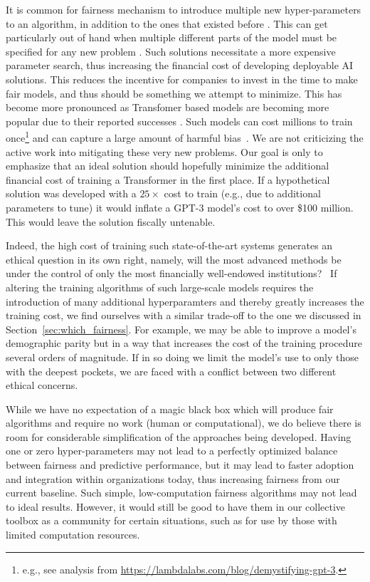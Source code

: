 \documentclass[11pt]{article}
\begin{document}
It is common for fairness mechanism to introduce multiple new hyper-parameters to an algorithm, in addition to the ones that existed before \cite{pmlr-v28-zemel13,Louizos2016,Edwards2016}. This can get particularly out of hand when multiple different parts of the model must be specified for any new problem \cite{Johndrow2017}. Such solutions necessitate a more expensive parameter search, thus increasing the financial cost of developing deployable AI solutions. This reduces the incentive for companies to invest in the time to make fair models, and thus should be something we attempt to minimize. This has become more pronounced as Transfomer based models are becoming more popular due to their reported successes \cite{Brown2020}. Such models can cost millions to train once\footnote{e.g., see analysis from \url{https://lambdalabs.com/blog/demystifying-gpt-3}.} and can capture a large amount of harmful bias~\cite{gehman-etal-2020-realtoxicityprompts}. We are not criticizing the active work into mitigating these very new problems. Our goal is only to emphasize that an ideal solution should hopefully minimize the additional financial cost of training a Transformer in the first place. If a hypothetical solution was developed with a $25\times$ cost to train (e.g., due to additional parameters to tune) it would inflate a GPT-3 model's cost to over \$100 million. This would leave the solution fiscally untenable.

Indeed, the high cost of training such state-of-the-art systems generates an ethical question in its own right, namely, will the most advanced methods be under the control of only the most financially well-endowed institutions?~\cite{strubell2019energy}
If altering the training algorithms of such large-scale models requires the introduction of many additional hyperparamters and thereby greatly increases the training cost, we find ourselves with a similar trade-off to the one we discussed in Section~\ref{sec:which_fairness}. 
For example, we may be able to improve a model's demographic parity but in a way that increases the cost of the training procedure several orders of magnitude. If in so doing we limit the model's use to only those with the deepest pockets, we are faced with a conflict between two different ethical concerns.

While we have no expectation of a magic black box which will produce fair algorithms and require no work (human or computational), we do believe there is room for considerable simplification of the approaches being developed. Having one or zero hyper-parameters may not lead to a perfectly optimized balance between fairness and predictive performance, but it may lead to faster adoption and integration within organizations today, thus increasing fairness from our current baseline.
Such simple, low-computation fairness algorithms may not lead to ideal results. However, it would still be good to have them in our collective toolbox as a community for certain situations, such as for use by those with limited computation resources.
\end{document}
